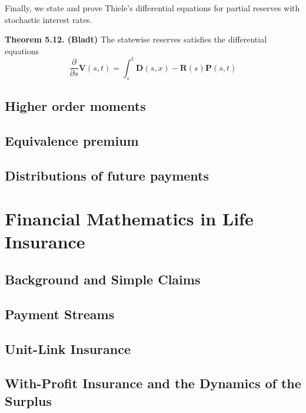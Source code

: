 \documentclass[
]{book}
\begin{document}
Finally, we state and prove Thiele's differential equations for partial reserves with stochastic interest
rates.

\textbf{Theorem 5.12. (Bladt)} The statewise reserves satisfies the differential equations
\[
\frac{\partial}{\partial s}\mathbf V(s,t)=\int_s^t\mathbf D(s,x) - \mathbf R(s)\mathbf P(s,t)
\]

\hypertarget{higher-order-moments}{%
\subsection{Higher order moments}\label{higher-order-moments}}

\hypertarget{equivalence-premium}{%
\subsection{Equivalence premium}\label{equivalence-premium}}

\hypertarget{distributions-of-future-payments}{%
\subsection{Distributions of future payments}\label{distributions-of-future-payments}}

\hypertarget{financial-mathematics-in-life-insurance}{%
\section{Financial Mathematics in Life Insurance}\label{financial-mathematics-in-life-insurance}}

\hypertarget{background-and-simple-claims}{%
\subsection{Background and Simple Claims}\label{background-and-simple-claims}}

\hypertarget{payment-streams}{%
\subsection{Payment Streams}\label{payment-streams}}

\hypertarget{unit-link-insurance}{%
\subsection{Unit-Link Insurance}\label{unit-link-insurance}}

\hypertarget{with-profit-insurance-and-the-dynamics-of-the-surplus}{%
\subsection{With-Profit Insurance and the Dynamics of the Surplus}\label{with-profit-insurance-and-the-dynamics-of-the-surplus}}
\end{document}
